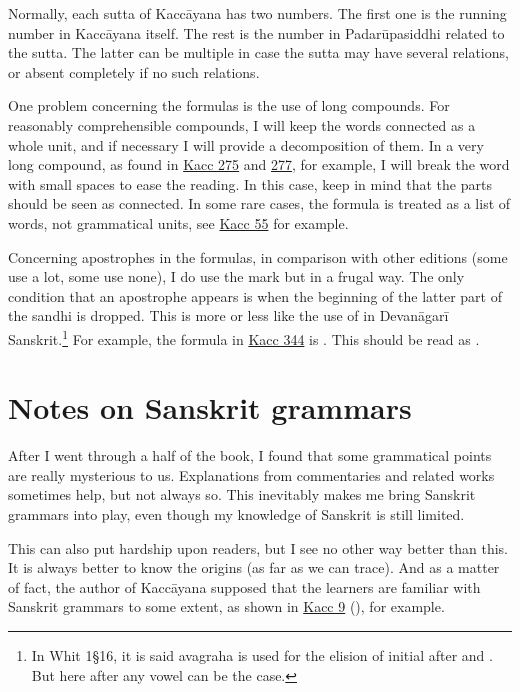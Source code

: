 Normally, each sutta of Kaccāyana has two numbers. The first one is the running number in Kaccāyana itself. The rest is the number in Padarūpasiddhi related to the sutta. The latter can be multiple in case the sutta may have several relations, or absent completely if no such relations.

One problem concerning the formulas is the use of long compounds. For reasonably comprehensible compounds, I will keep the words connected as a whole unit, and if necessary I will provide a decomposition of them. In a very long compound, as found in \hyperref[sut:275]{Kacc 275} and \hyperref[sut:277]{277}, for example, I will break the word with small spaces to ease the reading. In this case, keep in mind that the parts should be seen as connected. In some rare cases, the formula is treated as a list of words, not grammatical units, see \hyperref[sut:55]{Kacc 55} for example.

Concerning apostrophes in the formulas, in comparison with other editions (some use a lot, some use none), I do use the mark but in a frugal way. The only condition that an apostrophe appears is when the beginning  of the latter part of the sandhi is dropped. This is more or less like the use of  in Devanāgarī Sanskrit.\footnote{In Whit 1\S16, it is said avagraha is used for the elision of initial  after  and . But here  after any vowel can be the case.} For example, the formula in \hyperref[sut:344]{Kacc 344} is . This should be read as .

\section*{Notes on Sanskrit grammars}

After I went through a half of the book, I found that some grammatical points are really mysterious to us. Explanations from commentaries and related works sometimes help, but not always so. This inevitably makes me bring Sanskrit grammars into play, even though my knowledge of Sanskrit is still limited.

This can also put hardship upon readers, but I see no other way better than this. It is always better to know the origins (as far as we can trace). And as a matter of fact, the author of Kaccāyana supposed that the learners are familiar with Sanskrit grammars to some extent, as shown in \hyperref[sut:9]{Kacc 9} (), for example.

